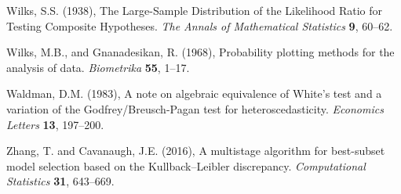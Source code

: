 \phantom{a}

\rff Wilks, S.S. (1938),
      The Large-Sample Distribution of the Likelihood Ratio for Testing Composite Hypotheses.
      {\it The Annals of Mathematical Statistics}
      {\bf 9}, {60--62}.

\phantom{a}

\rff Wilks, M.B., and Gnanadesikan, R. (1968),
      Probability plotting methods for the analysis of data.
      {\it Biometrika}
      {\bf 55}, {1--17}.

\phantom{a}

\rff Waldman, D.M. (1983),
      A note on algebraic equivalence of White's test and a variation of the Godfrey/Breusch-Pagan test for heteroscedasticity.
      {\it Economics Letters}
      {\bf 13}, {197--200}.

\phantom{a}

\rff Zhang, T. and  Cavanaugh, J.E. (2016),
      A multistage algorithm for best-subset model selection based on the Kullback–Leibler discrepancy.
      {\it Computational Statistics}
      {\bf 31}, {643--669}.